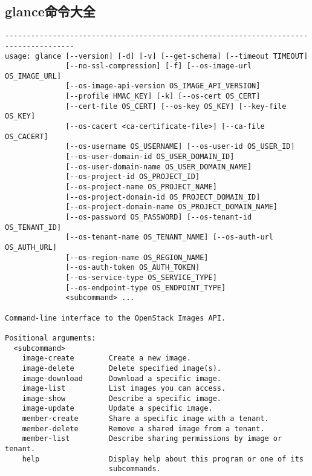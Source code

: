 \documentclass[a4paper,left=1.5cm,right=1.5cm,11pt]{article}
\begin{document}
\subsection{glance命令大全}
\begin{lstlisting}
--------------------------------------------------------------------------------------
usage: glance [--version] [-d] [-v] [--get-schema] [--timeout TIMEOUT]
              [--no-ssl-compression] [-f] [--os-image-url OS_IMAGE_URL]
              [--os-image-api-version OS_IMAGE_API_VERSION]
              [--profile HMAC_KEY] [-k] [--os-cert OS_CERT]
              [--cert-file OS_CERT] [--os-key OS_KEY] [--key-file OS_KEY]
              [--os-cacert <ca-certificate-file>] [--ca-file OS_CACERT]
              [--os-username OS_USERNAME] [--os-user-id OS_USER_ID]
              [--os-user-domain-id OS_USER_DOMAIN_ID]
              [--os-user-domain-name OS_USER_DOMAIN_NAME]
              [--os-project-id OS_PROJECT_ID]
              [--os-project-name OS_PROJECT_NAME]
              [--os-project-domain-id OS_PROJECT_DOMAIN_ID]
              [--os-project-domain-name OS_PROJECT_DOMAIN_NAME]
              [--os-password OS_PASSWORD] [--os-tenant-id OS_TENANT_ID]
              [--os-tenant-name OS_TENANT_NAME] [--os-auth-url OS_AUTH_URL]
              [--os-region-name OS_REGION_NAME]
              [--os-auth-token OS_AUTH_TOKEN]
              [--os-service-type OS_SERVICE_TYPE]
              [--os-endpoint-type OS_ENDPOINT_TYPE]
              <subcommand> ...

Command-line interface to the OpenStack Images API.

Positional arguments:
  <subcommand>
    image-create        Create a new image.
    image-delete        Delete specified image(s).
    image-download      Download a specific image.
    image-list          List images you can access.
    image-show          Describe a specific image.
    image-update        Update a specific image.
    member-create       Share a specific image with a tenant.
    member-delete       Remove a shared image from a tenant.
    member-list         Describe sharing permissions by image or tenant.
    help                Display help about this program or one of its
                        subcommands.


\end{lstlisting}
\end{document}
